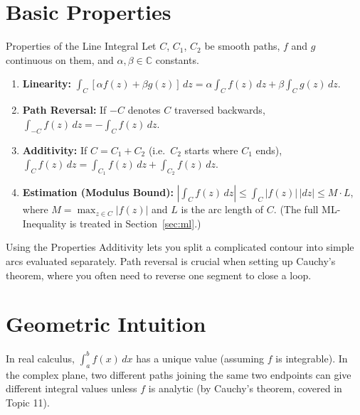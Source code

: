 \documentclass[12pt,a4paper]{article}
\begin{document}
\section{Basic Properties}
\begin{infobox}{Properties of the Line Integral}
Let $C$, $C_1$, $C_2$ be smooth paths, $f$ and $g$ continuous on them, and
$\alpha, \beta \in \mathbb{C}$ constants.

\begin{enumerate}[label=\textbf{P\arabic*.}, leftmargin=*, nosep]
  \item \textbf{Linearity:}
        $\displaystyle\int_C [\alpha f(z) + \beta g(z)]\,dz
         = \alpha\int_C f(z)\,dz + \beta\int_C g(z)\,dz$.

  \item \textbf{Path Reversal:} If $-C$ denotes $C$ traversed backwards,
        $\displaystyle\int_{-C} f(z)\,dz = -\int_C f(z)\,dz$.

  \item \textbf{Additivity:} If $C = C_1 + C_2$ (i.e.\ $C_2$ starts where
        $C_1$ ends),
        $\displaystyle\int_C f(z)\,dz
         = \int_{C_1} f(z)\,dz + \int_{C_2} f(z)\,dz$.

  \item \textbf{Estimation (Modulus Bound):}
        $\displaystyle\left|\int_C f(z)\,dz\right|
         \le \int_C |f(z)|\,|dz|
         \le M \cdot L$,
        where $M = \max_{z \in C}|f(z)|$ and $L$ is the arc length of $C$.
        (The full ML-Inequality is treated in Section~\ref{sec:ml}.)
\end{enumerate}
\end{infobox}

\begin{learnbox}{Using the Properties}
Additivity lets you split a complicated contour into simple arcs evaluated
separately. Path reversal is crucial when setting up Cauchy's theorem, where
you often need to reverse one segment to close a loop.
\end{learnbox}

\section{Geometric Intuition}
In real calculus, $\int_a^b f(x)\,dx$ has a unique value (assuming $f$
is integrable). In the complex plane, two different paths joining the same
two endpoints can give different integral values unless $f$ is analytic (by
Cauchy's theorem, covered in Topic 11).
\end{document}
